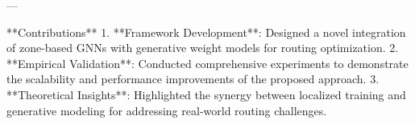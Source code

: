 ---

**Contributions**  
1. **Framework Development**: Designed a novel integration of zone-based GNNs with generative weight models for routing optimization.
2. **Empirical Validation**: Conducted comprehensive experiments to demonstrate the scalability and performance improvements of the proposed approach.
3. **Theoretical Insights**: Highlighted the synergy between localized training and generative modeling for addressing real-world routing challenges.

